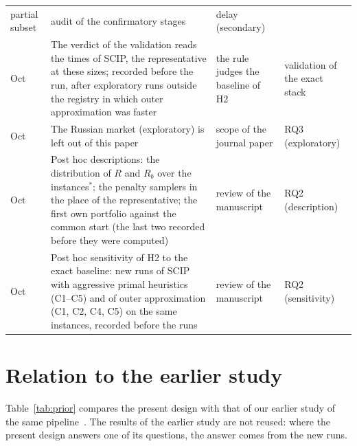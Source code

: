 {\begin{longtable}{>{\raggedright\arraybackslash}p{}>{\raggedright\arraybackslash}p{}>{\raggedright\arraybackslash}p{}>{\raggedright\arraybackslash}p{}}
partial subset & audit of the confirmatory stages & delay (secondary) \\
18 Oct & The verdict of the validation reads the times of SCIP, the representative at these sizes; recorded before
the run, after exploratory runs outside the registry in which outer approximation was faster & the rule judges the
baseline of H2 & validation of the exact stack \\
18 Oct & The Russian market (exploratory) is left out of this paper & scope of the journal paper & RQ3 (exploratory) \\
19 Oct & Post hoc descriptions: the distribution of $R$ and $R_b$ over the instances$^{\ast}$; the penalty samplers in
the place of the representative; the first own portfolio against the common start (the last two recorded before
they were computed) & review of the manuscript & RQ2 (description) \\
19 Oct & Post hoc sensitivity of H2 to the exact baseline: new runs of SCIP with aggressive primal heuristics (C1--C5)
and of outer approximation (C1, C2, C4, C5) on the same instances, recorded before the runs & review of the
manuscript & RQ2 (sensitivity) \\
\end{longtable}}

\section{Relation to the earlier study}\label{app:prior}

Table~\ref{tab:prior} compares the present design with that of our earlier study of the same
pipeline~\cite{avdoshin2026discrete}. The results of the earlier study are not reused: where the present design answers one of its questions,
the answer comes from the new runs.

